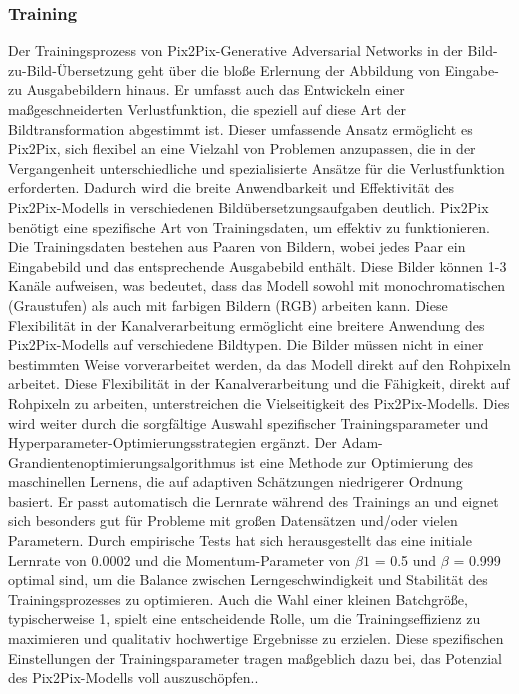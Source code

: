 \subsubsection{Training}

Der Trainingsprozess von Pix2Pix-Generative Adversarial Networks in der Bild-zu-Bild-Übersetzung geht über die bloße Erlernung der Abbildung von Eingabe- zu Ausgabebildern hinaus. Er umfasst auch das Entwickeln einer maßgeschneiderten Verlustfunktion, die speziell auf diese Art der Bildtransformation abgestimmt ist. Dieser umfassende Ansatz ermöglicht es Pix2Pix, sich flexibel an eine Vielzahl von Problemen anzupassen, die in der Vergangenheit unterschiedliche und spezialisierte Ansätze für die Verlustfunktion erforderten. Dadurch wird die breite Anwendbarkeit und Effektivität des Pix2Pix-Modells in verschiedenen Bildübersetzungsaufgaben deutlich. Pix2Pix benötigt eine spezifische Art von Trainingsdaten, um effektiv zu funktionieren. Die Trainingsdaten bestehen aus Paaren von Bildern, wobei jedes Paar ein Eingabebild und das entsprechende Ausgabebild enthält. Diese Bilder können 1-3 Kanäle aufweisen, was bedeutet, dass das Modell sowohl mit monochromatischen (Graustufen) als auch mit farbigen Bildern (RGB) arbeiten kann. Diese Flexibilität in der Kanalverarbeitung ermöglicht eine breitere Anwendung des Pix2Pix-Modells auf verschiedene Bildtypen. Die Bilder müssen nicht in einer bestimmten Weise vorverarbeitet werden, da das Modell direkt auf den Rohpixeln arbeitet. Diese Flexibilität in der Kanalverarbeitung und die Fähigkeit, direkt auf Rohpixeln zu arbeiten, unterstreichen die Vielseitigkeit des Pix2Pix-Modells. Dies wird weiter durch die sorgfältige Auswahl spezifischer Trainingsparameter und Hyperparameter-Optimierungsstrategien ergänzt. Der Adam-Grandientenoptimierungsalgorithmus ist eine Methode zur Optimierung des maschinellen Lernens, die auf adaptiven Schätzungen niedrigerer Ordnung basiert. Er passt automatisch die Lernrate während des Trainings an und eignet sich besonders gut für Probleme mit großen Datensätzen und/oder vielen Parametern. Durch empirische Tests hat sich herausgestellt das eine initiale Lernrate von 0.0002 und die Momentum-Parameter von $\beta1$ = 0.5 und $\beta$ = 0.999 optimal sind, um die Balance zwischen Lerngeschwindigkeit und Stabilität des Trainingsprozesses zu optimieren. Auch die Wahl einer kleinen Batchgröße, typischerweise 1, spielt eine entscheidende Rolle, um die Trainingseffizienz zu maximieren und qualitativ hochwertige Ergebnisse zu erzielen. Diese spezifischen Einstellungen der Trainingsparameter tragen maßgeblich dazu bei, das Potenzial des Pix2Pix-Modells voll auszuschöpfen.\cite{PhillipIsola.}.\newline
